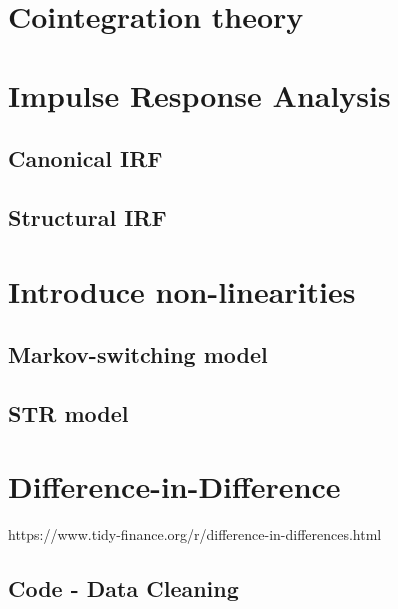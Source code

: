 \documentclass[hidelinks,12pts]{article}
\DeclareMathOperator{\1}{\mathbbm{1}}
\begin{document}




\section{Cointegration theory}\label{sec:cointegration}




\section{Impulse Response Analysis}\label{sec:irf}
    \subsection{Canonical IRF}\label{sec:canonical_irf}


    \subsection{Structural IRF}\label{sec:structural_irf}



\section{Introduce non-linearities}\label{sec:nonlinearities}
    \subsection{Markov-switching model}\label{sec:markov}

    
    \subsection{STR model}\label{sec:str}



\section{Difference-in-Difference}
https://www.tidy-finance.org/r/difference-in-differences.html
    



\newpage
\begin{appendices}
    
    \section{Code - Data Cleaning} \label{sec:dta_clean}
        

\end{appendices}
\end{document}
